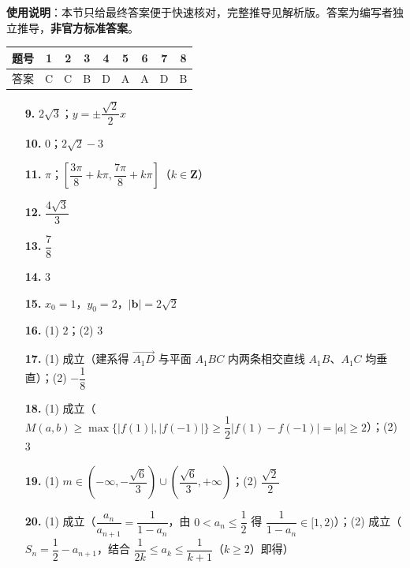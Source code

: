 
\begin{gknotice}
\textbf{使用说明}：本节只给最终答案便于快速核对，完整推导见解析版。答案为编写者独立推导，\textbf{非官方标准答案}。
\end{gknotice}

\begin{center}\begin{tabular}{ccccccccc}
\toprule
题号 & 1 & 2 & 3 & 4 & 5 & 6 & 7 & 8 \\
\midrule
答案 & C & C & B & D & A & A & D & B \\
\bottomrule
\end{tabular}\end{center}

\begin{itemize}[leftmargin=2.6em]
  \item[\textbf{9.}] \(2\sqrt3\)；\(y=\pm\dfrac{\sqrt2}{2}x\)
  \item[\textbf{10.}] \(0\)；\(2\sqrt2-3\)
  \item[\textbf{11.}] \(\pi\)；\(\left[\dfrac{3\pi}{8}+k\pi,\dfrac{7\pi}{8}+k\pi\right]\)（\(k\in\mathbf{Z}\)）
  \item[\textbf{12.}] \(\dfrac{4\sqrt3}{3}\)
  \item[\textbf{13.}] \(\dfrac78\)
  \item[\textbf{14.}] \(3\)
  \item[\textbf{15.}] \(x_0=1\)，\(y_0=2\)，\(|\boldsymbol{b}|=2\sqrt2\)
\end{itemize}

\begin{itemize}[leftmargin=2.6em]
  \item[\textbf{16.}] (1) \(2\)；(2) \(3\)
  \item[\textbf{17.}] (1) 成立（建系得 \(\overrightarrow{A_1D}\) 与平面 \(A_1BC\) 内两条相交直线 \(A_1B\)、\(A_1C\) 均垂直）；(2) \(-\dfrac18\)
  \item[\textbf{18.}] (1) 成立（\(M(a,b)\geqslant\max\{|f(1)|,|f(-1)|\}\geqslant\dfrac12|f(1)-f(-1)|=|a|\geqslant2\)）；(2) \(3\)
  \item[\textbf{19.}] (1) \(m\in\left(-\infty,-\dfrac{\sqrt6}{3}\right)\cup\left(\dfrac{\sqrt6}{3},+\infty\right)\)；(2) \(\dfrac{\sqrt2}{2}\)
  \item[\textbf{20.}] (1) 成立（\(\dfrac{a_n}{a_{n+1}}=\dfrac{1}{1-a_n}\)，由 \(0<a_n\leqslant\dfrac12\) 得 \(\dfrac{1}{1-a_n}\in[1,2)\)）；(2) 成立（\(S_n=\dfrac12-a_{n+1}\)，结合 \(\dfrac{1}{2k}\leqslant a_k\leqslant\dfrac{1}{k+1}\)（\(k\geqslant2\)）即得）
\end{itemize}
